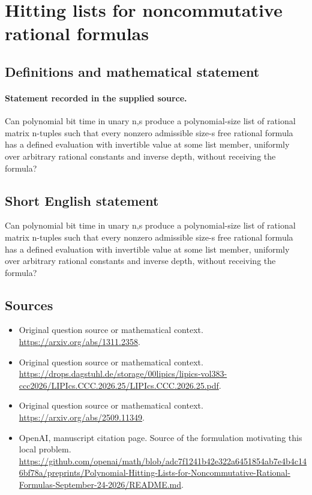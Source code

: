 \documentclass[11pt]{article}
\begin{document}
\section*{Hitting lists for noncommutative rational formulas}\label{statement}
\subsection{Definitions and mathematical statement}
\paragraph{Statement recorded in the supplied source.}
Can polynomial bit time in unary n,s produce a polynomial-size list of rational matrix n-tuples such that every nonzero admissible size-s free rational formula has a defined evaluation with invertible value at some list member, uniformly over arbitrary rational constants and inverse depth, without receiving the formula?
\subsection{Short English statement}
Can polynomial bit time in unary n,s produce a polynomial-size list of rational matrix n-tuples such that every nonzero admissible size-s free rational formula has a defined evaluation with invertible value at some list member, uniformly over arbitrary rational constants and inverse depth, without receiving the formula?
\subsection{Sources}
\begin{itemize}
\item[S1] Original question source or mathematical context.
\url{https://arxiv.org/abs/1311.2358}.
\item[S2] Original question source or mathematical context.
\url{https://drops.dagstuhl.de/storage/00lipics/lipics-vol383-ccc2026/LIPIcs.CCC.2026.25/LIPIcs.CCC.2026.25.pdf}.
\item[S3] Original question source or mathematical context.
\url{https://arxiv.org/abs/2509.11349}.
\item[S4] OpenAI, manuscript citation page. Source of the formulation motivating this local problem.
\url{https://github.com/openai/math/blob/adc7f1241b42e322a6451854ab7e4b4c146bf78a/preprints/Polynomial-Hitting-Lists-for-Noncommutative-Rational-Formulas-September-24-2026/README.md}.
\end{itemize}
\end{document}
